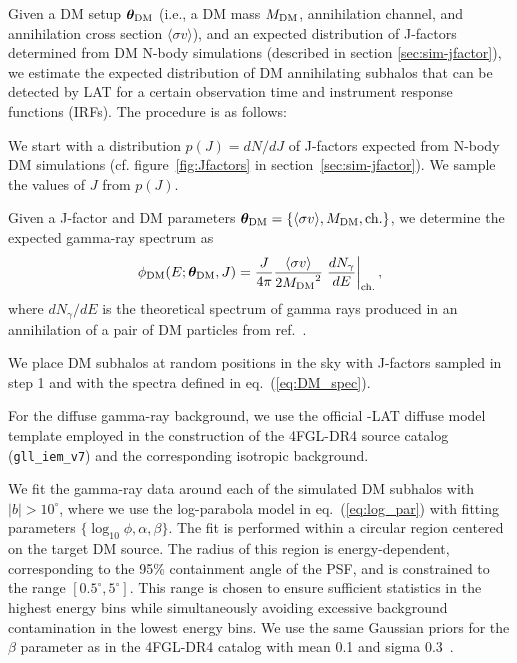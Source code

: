 Given a DM setup $\boldsymbol{\theta}_{\rm DM}$ (i.e., a DM mass ${{M_\textrm{DM}}}$, annihilation channel,
and annihilation cross section $\langle\sigma v\rangle$), and an expected distribution of J-factors  determined from DM N-body simulations (described in section \ref{sec:sim-jfactor}), 
we estimate the expected distribution of DM annihilating subhalos that can be detected by {\Fermi} LAT for a certain observation time and instrument response functions (IRFs). 
The procedure is as follows:
\ben
\item
We start with a distribution $p(J) = dN / dJ$ of J-factors expected from N-body DM simulations (cf. figure~\ref{fig:Jfactors} in section~\ref{sec:sim-jfactor}). We sample the values of $J$ from $p(J)$. 
\item
Given a J-factor and DM parameters
$\boldsymbol{\theta}_{\rm DM} = \{\langle\sigma v\rangle, {{M_\textrm{DM}}}, {\rm ch.}\}$, 
we determine the expected gamma-ray spectrum as
\begin{equation}
\label{eq:DM_spec}
\phi_{\rm DM}(E;\boldsymbol{\theta}_{\rm DM}, J) = \frac{J}{4\pi} \frac{\langle \sigma v \rangle}{2{M_\textrm{DM}}^2} \left.\frac{dN_\gamma}{dE}\right|_{\rm ch.},
\end{equation}
where $dN_\gamma/dE$ is the theoretical spectrum of gamma rays produced in an annihilation of a pair of DM particles from ref.~\cite{Arina:2023eic}. 
\item
We place DM subhalos at random positions in the sky with J-factors sampled in step 1 and with the spectra defined in eq.~(\ref{eq:DM_spec}).
\item 
For the diffuse gamma-ray background, we use the official \Fermi-LAT diffuse model template employed in the construction of the 4FGL-DR4 source catalog (\verb|gll_iem_v7|) and the corresponding isotropic background.
\item
We fit the gamma-ray data around each of the simulated DM subhalos with $|b| > 10^\circ$,
where we use the log-parabola model in eq.~(\ref{eq:log_par}) with fitting parameters $\{\log_{10}\phi, \alpha,\beta\}$. 
The fit is performed within a circular region centered on the target DM source. The radius of this region is energy-dependent, corresponding to the 95\% containment angle of the PSF, and is constrained to the range $[0.5^\circ, 5^\circ]$. This range is chosen to ensure sufficient statistics in the highest energy bins while simultaneously avoiding excessive background contamination in the lowest energy bins.
We use the same Gaussian priors for the $\beta$ parameter as in the 4FGL-DR4 catalog with mean 0.1 and sigma 0.3~\cite{Ballet:2023qzs}.
